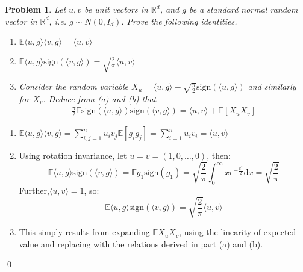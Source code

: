 \documentclass[12pt]{article}
\newtheorem{ex}{Problem}
\begin{document}
\begin{bx}
	
	\begin{ex}
	Let $u,v$ be unit vectors in $\mathbb{R}^d$, and $g$ be a standard normal random vector in $\mathbb{R}^d$,
	i.e. $g\sim N(0,I_d)$. Prove the following identities.
	\begin{enumerate}[label=(\alph*)]
		\item $\mathbb{E}\langle u,g\rangle\langle v,g\rangle=\langle u,v \rangle$
		\item $\mathbb{E}\langle u,g\rangle\mathrm{sign}(\langle v,g\rangle)=\sqrt{\frac{2}{\pi}}\langle u,v\rangle$
		\item Consider the random variable $X_u = \langle u ,g\rangle - \sqrt{\frac{\pi}{2}}\mathrm{sign}(\langle u,g\rangle)$ and similarly for $X_v$. Deduce from (a) and (b) that
		\begin{align}\label{eq:1}
		\frac{\pi}{2}\mathbb{E} \mathrm{sign}(\langle u,g\rangle)\mathrm{sign}(\langle v,g\rangle) = \langle u,v\rangle + \mathbb{E}[X_uX_v]
		\end{align}
	\end{enumerate}
	\end{ex}
	\tcblower
	\begin{enumerate}[label=(\alph*)]
		\item$ 
		\mathbb{E}\langle u,g\rangle\langle v,g\rangle=\sum_{i,j=1}^{n}u_iv_j\mathbb{E}[g_ig_j]=\sum_{i=1}^{n}u_iv_i=\langle u,v\rangle$
		
		\item  Using rotation invariance, let $u=v=(1,0,\dots,0)$,
		then:
		\[
		\mathbb{E}\langle u,g\rangle\mathrm{sign}(\langle v,g\rangle)=\mathbb{E}g_1\mathrm{sign}(g_1)=\sqrt{\frac{2}{\pi}}\int_{0}^{\infty}xe^{-\frac{x^2}{2}}\mathrm{d}x=\sqrt{\frac{2}{\pi}}
		\]
		Further,$\langle u,v\rangle=1$, so:
		\[
		\mathbb{E}\langle u,g\rangle\mathrm{sign}(\langle v,g\rangle) = \sqrt{\frac{2}{\pi}}\langle u,v\rangle
		\]
		\item This simply results from expanding $\mathbb{E}X_uX_v$, using the linearity of expected value and replacing with the relations derived in part (a) and (b).
		
	\end{enumerate}
	\qed
\end{bx}
\end{document}
